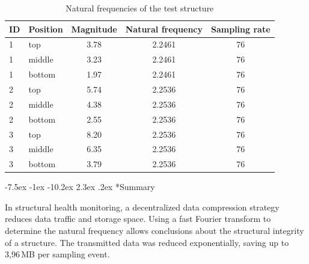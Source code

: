 \documentclass[12pt,a4paper]{scrartcl}
\makeatletter
\renewcommand\section{\@startsection{section}{1}{\z@}%
                     {-7.5ex \@plus -1ex \@minus -10.2ex}%
                     {2.3ex \@plus.2ex}%
                     {\sffamily\large\bfseries}}
\makeatother
\begin{document}
\begin{table}[hb]
	\centering
	\begin{tabular}{l l c c c}
		\toprule
		ID & Position & Magnitude & Natural frequency & Sampling rate\\ 
		\midrule
		1 & top & 3.78 & 2.2461 & 76\\ 
		1 & middle & 3.23 & 2.2461 & 76\\ 
		1 & bottom & 1.97 & 2.2461 & 76\\ 
		\midrule	
		2 & top & 5.74 & 2.2536 & 76\\  
		2 & middle & 4.38 & 2.2536 & 76\\ 
		2 & bottom & 2.55 & 2.2536 & 76\\
		\midrule
		3 & top & 8.20 & 2.2536 & 76\\
		3 & middle & 6.35 & 2.2536 & 76\\ 
		3 & bottom & 3.79 & 2.2536 & 76\\
		\bottomrule
	\end{tabular}
	\caption{Natural frequencies of the test structure}
	\label{tab:lab-ex}
\end{table}


\section*{Summary}

In structural health monitoring, a decentralized data compression strategy reduces data traffic and storage space.
Using a fast Fourier transform to determine the natural frequency allows conclusions about the structural integrity of a structure.
The transmitted data was reduced exponentially, saving up to 3,96\,MB per sampling event.




\end{document}

